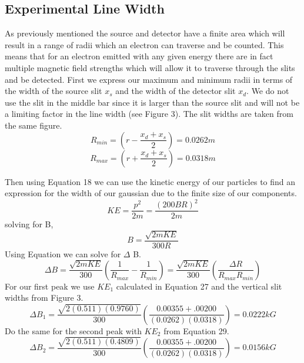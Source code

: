 \subsection{Experimental Line Width}
As previously mentioned the source and detector have a finite area which will result in a range of radii which an electron can traverse and be counted. This means that for an electron emitted with any given energy there are in fact multiple magnetic field strengths which will allow it to traverse through the slits and be detected. First we express our maximum and minimum radii in terms of the width of the source slit $x_s$ and the width of the detector slit $x_d$.  We do not use the slit in the middle bar since it is larger than the source slit and will not be a limiting factor in the line width (see Figure 3). The slit widths are taken from the same figure. 
\begin{equation}
R_{min} = (r-\frac{x_d + x_s}{2}) = 0.0262 m 
\end{equation}  
\begin{equation}
R_{max} = (r+\frac{x_d + x_s}{2}) = 0.0318 m 
\end{equation}  

Then using Equation 18 we can use the kinetic energy of our particles to find an expression for the width of our gaussian due to the finite size of our components. 
\begin{equation}
KE =\frac{ p^{2}}{2m} = \frac{(200BR)^{2}}{2m} 
\end{equation} 
solving for B,
\begin{equation}
B = \frac{\sqrt{2mKE}}{300R}
\end{equation}
Using Equation we can solve for $\Delta$ B.
\begin{equation}
\Delta B = \frac{\sqrt{2mKE}}{300}(\frac{1}{R_{max}}-\frac{1}{R_{min}})= \frac{\sqrt{2mKE}}{300}(\frac{\Delta R}{R_{max}R_{min}})
\end{equation}
For our first peak we use $KE_{1}$ calculated in Equation 27 and the vertical slit widths from Figure 3.
\begin{equation}
\Delta B_{1} = \frac{\sqrt{2(0.511)(0.9760)}}{300}(\frac{0.00355 + .00200}{(0.0262)(0.0318)}) = 0.0222 kG
\end{equation}
Do the same for the second peak with $KE_{2}$ from Equation 29.
\begin{equation}
\Delta B_{2} = \frac{\sqrt{2(0.511)(0.4809)}}{300}(\frac{0.00355 + .00200}{(0.0262)(0.0318)}) = 0.0156 kG
\end{equation}


